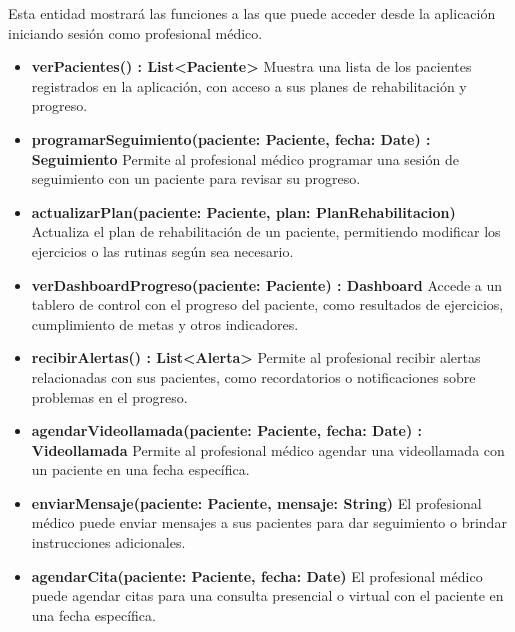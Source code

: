 \documentclass{article}
\begin{document}
Esta entidad mostrará las funciones a las que puede acceder desde la aplicación iniciando sesión como profesional médico.

\begin{itemize}
	\item \textbf{verPacientes() : List<Paciente>}  
	Muestra una lista de los pacientes registrados en la aplicación, con acceso a sus planes de rehabilitación y progreso.
	
	\item \textbf{programarSeguimiento(paciente: Paciente, fecha: Date) : Seguimiento}  
	Permite al profesional médico programar una sesión de seguimiento con un paciente para revisar su progreso.
	
	\item \textbf{actualizarPlan(paciente: Paciente, plan: PlanRehabilitacion)}  
	Actualiza el plan de rehabilitación de un paciente, permitiendo modificar los ejercicios o las rutinas según sea necesario.
	
	\item \textbf{verDashboardProgreso(paciente: Paciente) : Dashboard}  
	Accede a un tablero de control con el progreso del paciente, como resultados de ejercicios, cumplimiento de metas y otros indicadores.
	
	\item \textbf{recibirAlertas() : List<Alerta>}  
	Permite al profesional recibir alertas relacionadas con sus pacientes, como recordatorios o notificaciones sobre problemas en el progreso.
	
	\item \textbf{agendarVideollamada(paciente: Paciente, fecha: Date) : Videollamada}  
	Permite al profesional médico agendar una videollamada con un paciente en una fecha específica.
	
	\item \textbf{enviarMensaje(paciente: Paciente, mensaje: String)}  
	El profesional médico puede enviar mensajes a sus pacientes para dar seguimiento o brindar instrucciones adicionales.
	
	\item \textbf{agendarCita(paciente: Paciente, fecha: Date)}  
	El profesional médico puede agendar citas para una consulta presencial o virtual con el paciente en una fecha específica.
\end{itemize}
\end{document}
